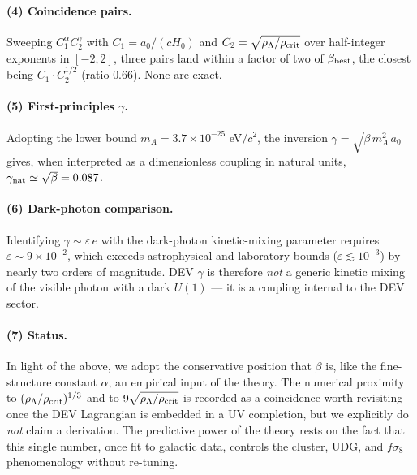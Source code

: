\paragraph{(4) Coincidence pairs.} Sweeping $C_{1}^{\alpha}C_{2}^{\gamma}$ with
$C_{1}=a_{0}/(cH_{0})$ and $C_{2}=\sqrt{\rho_{\Lambda}/\rho_{\rm crit}}$ over
half-integer exponents in $[-2,2]$, three pairs land within a factor of two
of $\beta_{\rm best}$, the closest being $C_{1}\cdot C_{2}^{1/2}$ (ratio
$0.66$). None are exact.

\paragraph{(5) First-principles $\gamma$.} Adopting the lower bound
$m_{A} = 3.7\times 10^{-25}$ eV$/c^{2}$, the inversion
$\gamma = \sqrt{\beta\, m_{A}^{2}\, a_{0}}$ gives, when interpreted as a
dimensionless coupling in natural units, $\gamma_{\rm nat}\simeq\sqrt{\beta}=0.087$.

\paragraph{(6) Dark-photon comparison.} Identifying $\gamma\sim\varepsilon\, e$
with the dark-photon kinetic-mixing parameter requires
$\varepsilon\sim 9\times 10^{-2}$, which exceeds astrophysical and laboratory
bounds ($\varepsilon\lesssim 10^{-3}$) by nearly two orders of magnitude.
DEV $\gamma$ is therefore \emph{not} a generic kinetic mixing of the visible
photon with a dark $U(1)$ — it is a coupling internal to the DEV sector.

\paragraph{(7) Status.} In light of the above, we adopt the conservative
position that $\beta$ is, like the fine-structure constant $\alpha$, an
empirical input of the theory. The numerical proximity to
$(\rho_{\Lambda}/\rho_{\rm crit})^{1/3}$ and to $9\sqrt{\rho_{\Lambda}/\rho_{\rm crit}}$
is recorded as a coincidence worth revisiting once the DEV Lagrangian is
embedded in a UV completion, but we explicitly do \emph{not} claim a
derivation. The predictive power of the theory rests on the fact that this
single number, once fit to galactic data, controls the cluster, UDG, and
$f\sigma_{8}$ phenomenology without re-tuning.
